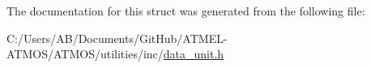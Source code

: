 The documentation for this struct was generated from the following file\-:\begin{DoxyCompactItemize}
\item 
C\-:/\-Users/\-A\-B/\-Documents/\-Git\-Hub/\-A\-T\-M\-E\-L-\/\-A\-T\-M\-O\-S/\-A\-T\-M\-O\-S/utilities/inc/\hyperlink{data__unit_8h}{data\-\_\-unit.\-h}\end{DoxyCompactItemize}
